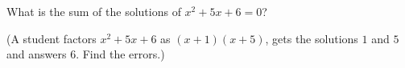 What is the sum of the solutions of $x^2+5x+6=0$?

(A student factors $x^2+5x+6$ as $(x+1)(x+5)$, gets the solutions $1$ and $5$ and answers $6$. Find the errors.)
